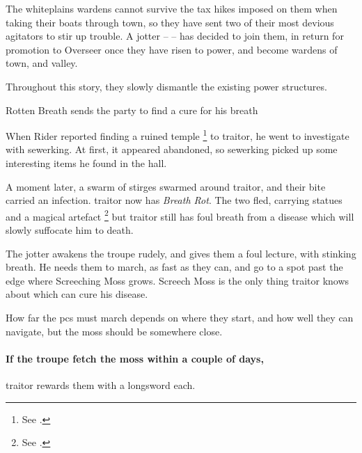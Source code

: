 
\noindent
The \gls{whiteplains} \glspl{warden} cannot survive the tax hikes imposed on them when taking their boats through \gls{town}, so they have sent two of their most devious agitators to stir up trouble.
A  \gls{jotter} --  -- has decided to join them, in return for promotion to Overseer once they have risen to power, and become \glspl{warden} of \gls{town}, and \gls{valley}.

Throughout this story, they slowly dismantle the existing power structures.

{Rotten Breath}%
{ sends the party to find a cure for his breath}%

\label{artPart1}
\begin{exampletext}
  When  Rider reported finding a ruined temple%
  \footnote{See .}
  to \gls{traitor}, he went to investigate with \gls{sewerking}.
  At first, it appeared abandoned, so \gls{sewerking} picked up some interesting items he found in the hall.

  A moment later, a swarm of stirges swarmed around \gls{traitor}, and their bite carried an infection.
  \Gls{traitor} now has \textit{Breath Rot}.
  The two fled, carrying statues and a magical \gls{artefact}%
  \footnote{See .}
  but \gls{traitor} still has foul breath from a disease which will slowly suffocate him to death.
\end{exampletext}


The \gls{jotter} awakens the troupe rudely, and gives them a foul lecture, with stinking breath.
He needs them to march, as fast as they can, and go to a spot past the \gls{edge} where Screeching Moss%
grows.
Screech Moss is the only thing \gls{traitor} knows about which can cure his disease.

How far the \glspl{pc} must march depends on where they start, and how well they can navigate,%
but the moss should be somewhere close.

\paragraph{If the troupe fetch the moss within a couple of days,}
\gls{traitor} rewards them with a longsword each.

